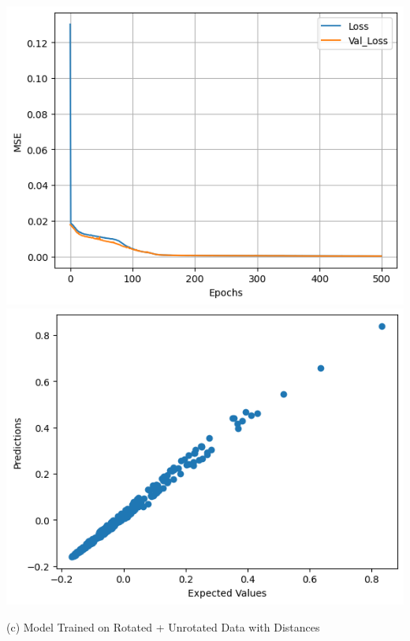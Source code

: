 \documentclass{article}
\begin{document}
\includegraphics[scale=0.5]{../images/dist_rot.png}
\includegraphics[scale=0.5]{../images/dist_rot2.png}
\begin{center} (c) Model Trained on Rotated + Unrotated Data with Distances \end{center}
\end{document}
